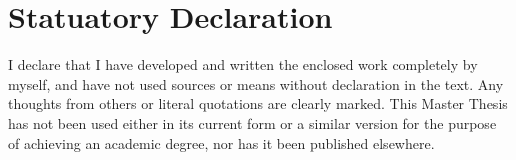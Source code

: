 \documentclass[Bachelorarbeit.tex]{subfiles}
\begin{document}
\chapter*{Statuatory Declaration}
I declare that I have developed and written the enclosed work completely by myself, and have not used sources or means without declaration in the text. Any thoughts from others or literal quotations are clearly marked. This Master Thesis has not been used either in its current form or a similar version for the purpose of achieving an academic degree, nor has it been published elsewhere.
\end{document}
